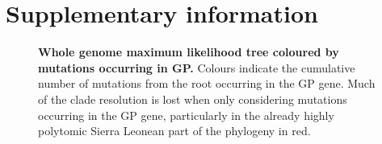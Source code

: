 \documentclass{bmcart}
\def\texttt{[image: ]}
\begin{document}
\begin{backmatter}

%
%

\end{backmatter}

\clearpage

\section*{Supplementary information}


\setcounter{figure}{0}
\setcounter{table}{0}
\renewcommand{\thefigure}{S\arabic{figure}}
\renewcommand{\thetable}{S\arabic{table}}


\begin{figure}[h]
 \centering
	\caption{\textbf{Whole genome maximum likelihood tree coloured by mutations occurring in GP.}
  Colours indicate the cumulative number of mutations from the root occurring in the GP gene.
  Much of the clade resolution is lost when only considering mutations occurring in the GP gene, particularly in the already highly polytomic Sierra Leonean part of the phylogeny in red.
	}
	\label{embedding}
\end{figure}
\end{document}
